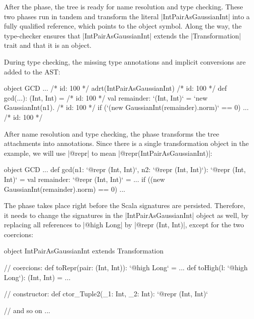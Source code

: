 After the \postparser{} phase, the tree is ready for name resolution and type checking. These two phases run in tandem and transform the literal |IntPairAsGaussianInt| into a fully qualified reference, which points to the object symbol. Along the way, the type-checker ensures that |IntPairAsGaussianInt| extends the |Transformation| trait and that it is an object.

During type checking, the missing type annotations and implicit conversions are added to the AST:

\vspace{-0.1em}
\begin{lstlisting-nobreak}
object GCD {
  ...
  /* id: 100 */ adrt(IntPairAsGaussianInt) {}
  /* id: 100 */ def gcd(...): (Int, Int) = {
  /* id: 100 */       val remainder: `(Int, Int)` = `new GaussianInt(n1).%
  /* id: 100 */       if (`(new GaussianInt(remainder).norm)` == 0) ...
  /* id: 100 */ }
}
\end{lstlisting-nobreak}

After name resolution and type checking, the \inject{} phase transforms the tree attachments into annotations. Since there is a single transformation object in the example, we will use |@repr| to mean |@repr(IntPairAsGaussianInt)|:

\vspace{-0.1em}
\begin{lstlisting-nobreak}
object GCD {
  ...
  def gcd(n1: `@repr (Int, Int)`, n2: `@repr (Int, Int)`): `@repr (Int, Int)` = {
    val remainder: `@repr (Int, Int)` = ...
    if ((new GaussianInt(remainder).norm) == 0) ...
  }
}
\end{lstlisting-nobreak}

The \inject{} phase takes place right before the Scala signatures are persisted. Therefore, it needs to change the signatures in the |IntPairAsGaussianInt| object as well, by replacing all references to |@high Long| by |@repr (Int, Int)|, except for the two coercions:

\vspace{-0.1em}
\begin{lstlisting-nobreak}
object IntPairAsGaussianInt extends Transformation{
  // coercions:
  def toRepr(pair: (Int, Int)): `@high Long` = ...
  def toHigh(l: `@high Long`): (Int, Int) = ...

  // constructor:
  def ctor_Tuple2(_1: Int, _2: Int): `@repr (Int, Int)`

  // and so on ...
}
\end{lstlisting-nobreak}

